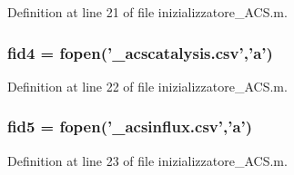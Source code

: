 Definition at line 21 of file inizializzatore\-\_\-\-A\-C\-S.\-m.

\hypertarget{a00062_a28f0b3b80ef3c84a4a00660a307d2147}{
\subsubsection[{fid4}]{\setlength{\rightskip}{0pt plus 5cm}fid4 = fopen('\-\_\-acscatalysis.\-csv','{\bf a}')}}\label{a00062_a28f0b3b80ef3c84a4a00660a307d2147}


Definition at line 22 of file inizializzatore\-\_\-\-A\-C\-S.\-m.

\hypertarget{a00062_af5f7ad66ed343bca8289a4d44dbff04f}{
\subsubsection[{fid5}]{\setlength{\rightskip}{0pt plus 5cm}fid5 = fopen('\-\_\-acsinflux.\-csv','{\bf a}')}}\label{a00062_af5f7ad66ed343bca8289a4d44dbff04f}


Definition at line 23 of file inizializzatore\-\_\-\-A\-C\-S.\-m.

